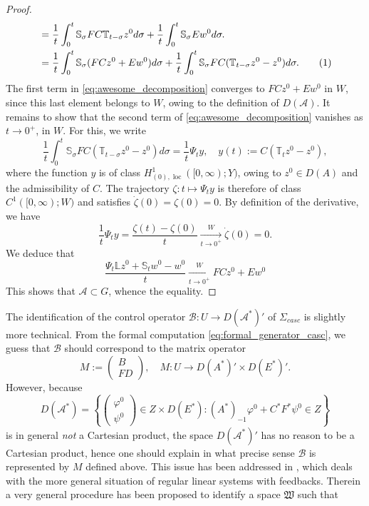 \documentclass[10pt]{article}
\newcommand{\oploc}{\operatorname{loc}}
\newcommand\numberthis{\addtocounter{equation}{1}\tag{\theequation}}
\begin{document}
\begin{proof}
\begin{align*}
    &= \frac{1}{t} \int_0^t \mathbb{S}_\sigma FC \mathbb{T}_{t-\sigma}z^0 d\sigma + \frac{1}{t} \int_0^t \mathbb{S}_\sigma E w^0 d\sigma. \\
    &= \frac{1}{t} \int_0^t \mathbb{S}_\sigma (FCz^0 + Ew^0) d\sigma + \frac{1}{t} \int_0^t \mathbb{S}_\sigma FC (\mathbb{T}_{t-\sigma}z^0 - z^0) d\sigma. \numberthis{} \label{eq:awesome_decomposition}
\end{align*}
The first term in \eqref{eq:awesome_decomposition} converges to $FC z^0 + Ew^0$ in $W$, since this last element belongs to $W$, owing to the definition of $D(\mathcal{A})$. It remains to show that the second term of \eqref{eq:awesome_decomposition} vanishes as $t \to 0^+$, in $W$. For this, we write 
\[
\frac{1}{t} \int_0^t \mathbb{S}_\sigma FC (\mathbb{T}_{t-\sigma}z^0 - z^0) d\sigma = \frac{1}{t} \Psi_t y,\quad y(t) := C (\mathbb{T}_t z^0 - z^0),
\]
where the function $y$ is of class $H^1_{(0),\oploc}([0,\infty) ; Y)$, owing to $z^0 \in D(A)$ and the admissibility of $C$. The trajectory $\zeta : t \mapsto \Psi_t y$ is therefore of class $C^1([0,\infty);W)$ \cite[Lemma 4.2.8]{tucsnak2009observation} and satisfies $\dot{\zeta}(0) = \zeta(0) = 0$. By definition of the derivative, we have 
\[
\frac{1}{t} \Psi_t y = \frac{\zeta(t)-\zeta(0)}{t} \xrightarrow[t \to 0^+]{W} \dot{\zeta}(0) = 0.
\]
We deduce that \[
\frac{\Psi_t \mathbb{L} z^0 + \mathbb{S}_t w^0 - w^0}{t} \xrightarrow[t \to 0^+]{W} FC z^0 + Ew^0
\]
 This shows that $\mathcal{A} \subset G$, whence the equality. 
\end{proof}
The identification of the control operator $\mathcal{B} : U \to D(\mathcal{A}^*)'$ of $\Sigma_{casc}$ is slightly more technical. From the formal computation \eqref{eq:formal_generator_casc}, we guess that $\mathcal{B}$ should correspond to the matrix operator 
\[
M := \left( \begin{array}{c}
    B \\
    FD 
\end{array}\right),\quad M : U \to D(A^*)' \times D(E^*)'.
\]
However, because 
\[
D(\mathcal{A}^*) = \left\lbrace \left( \begin{array}{c}
    \varphi^0 \\
    \psi^0 
\end{array}\right) \in Z \times D(E^*) : (A^*)_{-1}\varphi^0 + C^*F^* \psi^0 \in Z \right\rbrace
\]
is in general \textit{not} a Cartesian product, the space $D(\mathcal{A}^*)'$ has no reason to be a Cartesian product, hence one should explain in what precise sense $\mathcal{B}$  is represented by $M$ defined above. This issue has been addressed in \cite[pp 27, 52-56]{weiss_feedback}, which deals with the more general situation of regular linear systems with feedbacks. Therein a very general procedure has been proposed to identify a space $\mathfrak{W}$ such that 
\end{document}
